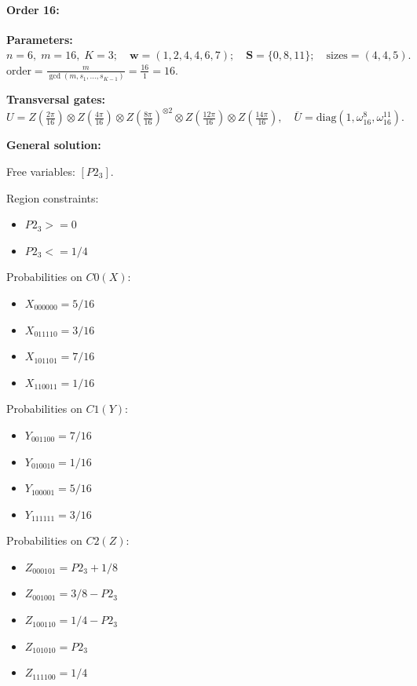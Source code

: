 \documentclass[11pt]{article}
\begin{document}
\paragraph{\textbf{Order 16:}}
\noindent\textbf{Parameters:} $n=6,\; m=16,\; K=3;\quad \mathbf w=(1, 2, 4, 4, 6, 7);\quad \mathbf S=\{0, 8, 11\};\quad \text{sizes}=\left(4, 4, 5\right).$ $\displaystyle \text{order}=\frac{m}{\gcd(m,s_1,\dots,s_{K-1})}=\frac{16}{1}=16.$

\noindent\textbf{Transversal gates:}
\[
    U=Z \left(\tfrac{2\pi}{16}\right) \otimes Z \left(\tfrac{4\pi}{16}\right) \otimes Z \left(\tfrac{8\pi}{16}\right)^{\otimes2} \otimes Z \left(\tfrac{12\pi}{16}\right) \otimes Z \left(\tfrac{14\pi}{16}\right),\quad
    \overline U=\mathrm{diag}(1,\omega_{16}^{8},\omega_{16}^{11}).
\]

\noindent\textbf{General solution:}

Free variables: $[P2_3]$.

Region constraints:
\begin{itemize}
    \item $P2_3 >= 0$
    \item $P2_3 <= 1/4$
\end{itemize}

Probabilities on $C0 (X)$:
\begin{itemize}
    \item $X_{000000} = 5/16$
    \item $X_{011110} = 3/16$
    \item $X_{101101} = 7/16$
    \item $X_{110011} = 1/16$
\end{itemize}

Probabilities on $C1 (Y)$:
\begin{itemize}
    \item $Y_{001100} = 7/16$
    \item $Y_{010010} = 1/16$
    \item $Y_{100001} = 5/16$
    \item $Y_{111111} = 3/16$
\end{itemize}

Probabilities on $C2 (Z)$:
\begin{itemize}
    \item $Z_{000101} = P2_3 + 1/8$
    \item $Z_{001001} = 3/8 - P2_3$
    \item $Z_{100110} = 1/4 - P2_3$
    \item $Z_{101010} = P2_3$
    \item $Z_{111100} = 1/4$
\end{itemize}
\end{document}
